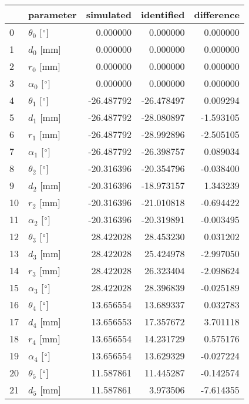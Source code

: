 \documentclass{standalone}%
\begin{document}
%
\normalsize%
\begin{tabular}{llrrr}
\toprule
{} &                 parameter &  simulated & identified & difference \\
\midrule
0  &  $\theta_{0}$ [$\degree$] &   0.000000 &   0.000000 &   0.000000 \\
1  &              $d_{0}$ [mm] &   0.000000 &   0.000000 &   0.000000 \\
2  &              $r_{0}$ [mm] &   0.000000 &   0.000000 &   0.000000 \\
3  &  $\alpha_{0}$ [$\degree$] &   0.000000 &   0.000000 &   0.000000 \\
4  &  $\theta_{1}$ [$\degree$] & -26.487792 & -26.478497 &   0.009294 \\
5  &              $d_{1}$ [mm] & -26.487792 & -28.080897 &  -1.593105 \\
6  &              $r_{1}$ [mm] & -26.487792 & -28.992896 &  -2.505105 \\
7  &  $\alpha_{1}$ [$\degree$] & -26.487792 & -26.398757 &   0.089034 \\
8  &  $\theta_{2}$ [$\degree$] & -20.316396 & -20.354796 &  -0.038400 \\
9  &              $d_{2}$ [mm] & -20.316396 & -18.973157 &   1.343239 \\
10 &              $r_{2}$ [mm] & -20.316396 & -21.010818 &  -0.694422 \\
11 &  $\alpha_{2}$ [$\degree$] & -20.316396 & -20.319891 &  -0.003495 \\
12 &  $\theta_{3}$ [$\degree$] &  28.422028 &  28.453230 &   0.031202 \\
13 &              $d_{3}$ [mm] &  28.422028 &  25.424978 &  -2.997050 \\
14 &              $r_{3}$ [mm] &  28.422028 &  26.323404 &  -2.098624 \\
15 &  $\alpha_{3}$ [$\degree$] &  28.422028 &  28.396839 &  -0.025189 \\
16 &  $\theta_{4}$ [$\degree$] &  13.656554 &  13.689337 &   0.032783 \\
17 &              $d_{4}$ [mm] &  13.656553 &  17.357672 &   3.701118 \\
18 &              $r_{4}$ [mm] &  13.656554 &  14.231729 &   0.575176 \\
19 &  $\alpha_{4}$ [$\degree$] &  13.656554 &  13.629329 &  -0.027224 \\
20 &  $\theta_{5}$ [$\degree$] &  11.587861 &  11.445287 &  -0.142574 \\
21 &              $d_{5}$ [mm] &  11.587861 &   3.973506 &  -7.614355 \\

\end{tabular}
\end{document}
